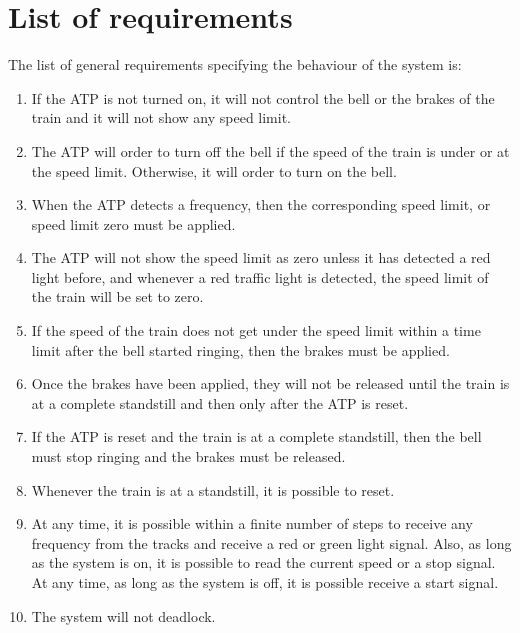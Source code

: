 \documentclass[11pt,a4paper]{article}
\begin{document}


\newpage

\section{List of requirements}

The list of general requirements specifying the behaviour of the system is:
\begin{enumerate}
	\item If the ATP is not turned on, it will not control the bell or the brakes of the train and it will not show any speed limit.
	
	\item The ATP will order to turn off the bell if the speed of the train is under or at the speed limit. Otherwise, it will order to turn on the bell.
	
	\item When the ATP detects a frequency, then the corresponding speed limit, or speed limit zero must be applied.
	
	\item The ATP will not show the speed limit as zero unless it has detected a red light before, and whenever a red traffic light is detected, the speed limit of the train will be set to zero.
	
	\item If the speed of the train does not get under the speed limit within a time limit after the bell started ringing, then the brakes must be applied. 

    \item Once the brakes have been applied, they will not be released until the train is at a complete standstill and then only after the ATP is reset. 

    \item If the ATP is reset and the train is at a complete standstill, then the bell must stop ringing and the brakes must be released. 
		
		\item Whenever the train is at a standstill, it is possible to reset.

    \item At any time, it is possible within a finite number of steps to receive any frequency from the tracks and receive a red or green light signal. Also, as long as the system is on, it is possible to  read the current speed or a stop signal. At any time, as long as the system is off, it is possible receive a start signal.
		
		\item The system will not deadlock.
   
\end{enumerate}
\end{document}
